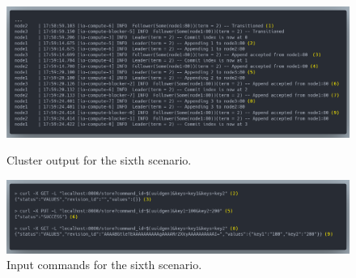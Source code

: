 \begin{figure}[!ht]
\centering
\includegraphics[width=500pt]{images/scenario_6_cluster.png}
\caption{Cluster output for the sixth scenario.}
\label{fig:scenario-6-cluster}
\includegraphics[width=500pt]{images/scenario_6_commands.png}
\caption{Input commands for the sixth scenario.}
\label{fig:scenario-6-commands}
\end{figure}

